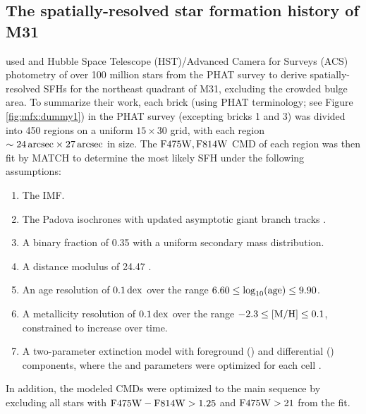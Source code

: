 \subsection{The spatially-resolved star formation history of M31}

\citet{Lewis:2014} used \acsb{} and \acsi{} Hubble Space Telescope
(HST)/Advanced Camera for Surveys (ACS) photometry of over 100 million stars
from the PHAT survey \citep{Dalcanton:2012} to derive spatially-resolved SFHs
for the northeast quadrant of M31, excluding the crowded bulge area. To
summarize their work, each brick (using PHAT terminology; see Figure
\ref{fig:mfx:dummy1}) in the PHAT survey (excepting bricks 1 and 3) was divided
into 450 regions on a uniform $15 \times 30$ grid, with each region $\sim
24\,\mathrm{arcsec} \times 27\,\mathrm{arcsec}$ in size. The $\mathrm{F475W},\mathrm{F814W}$ CMD of each region was
then fit by MATCH \citep{Dolphin:2002} to determine the most likely SFH under
the following assumptions:

\begin{enumerate}
\item The \citet{Kroupa:2001} IMF.
\item The Padova isochrones \citep{Marigo:2008} with updated asymptotic giant
    branch tracks \citep{Girardi:2010}.
\item A binary fraction of 0.35 with a uniform secondary mass distribution.
\item A distance modulus of 24.47 \citep{McConnachie:2005}.
\item An age resolution of $0.1\,\mathrm{dex}$ over the range $6.60 \le
    \log_{10}(\mathrm{age}) \le 9.90$.
\item A metallicity resolution of $0.1\,\mathrm{dex}$ over the range $-2.3 \le \mathrm{[M/H]} \le
    0.1$, constrained to increase over time.
\item A two-parameter extinction model with foreground (\avf{}) and
    differential (\dav{}) components, where the \avf{} and \dav{} parameters
    were optimized for each cell \citep[see also][]{Simones:2014}.
\end{enumerate}

In addition, the modeled CMDs were optimized to the main sequence by excluding
all stars with $\mathrm{F475W} - \mathrm{F814W} > 1.25$ and $\mathrm{F475W} > 21$ from the fit.


